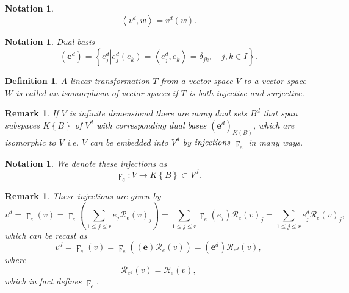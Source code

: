 \documentclass[aps,preprint]{revtex4}%
\newtheorem{definition}[theorem]{Definition}
\newtheorem{notation}[theorem]{Notation}
\newtheorem{remark}[theorem]{Remark}
\begin{document}
\begin{notation}%
\begin{equation}
\left\langle v^{d},w\right\rangle =v^{d}\left(  w\right)  .
\end{equation}

\end{notation}

\begin{notation}
Dual basis
\begin{equation}
\left(  \mathbf{e}^{d}\right)  =\left\{  \left.  e_{j}^{d}\right\vert
e_{j}^{d}\left(  e_{k}\right)  =\left\langle e_{j}^{d},e_{k}\right\rangle
=\delta_{jk},\quad j,k\in I\right\}  .
\end{equation}

\end{notation}

\begin{definition}
A linear transformation $T$ from a vector space $V$ to a vector space $W$ is
called an \emph{isomorphism of vector spaces} if $T$ is both \emph{injective}
and \emph{surjective}.
\end{definition}

\begin{remark}
If $V$ is infinite dimensional there are many dual sets $B^{d}$ that span
subspaces $K\left\{  B\right\}  $ of $V^{d}$ with corresponding dual bases
$\left(  \mathbf{e}^{d}\right)  _{K\left(  B\right)  }$, which are isomorphic
to $V$ i.e. $V$ can be embedded \emph{into} $V^{d}$ by $\emph{injections}$
$\digamma_{e}$ in many ways.
\end{remark}

\begin{notation}
We denote these injections as
\begin{equation}
\digamma_{e}:V\rightarrow K\left\{  B\right\}  \subset V^{d}.
\end{equation}

\end{notation}

\begin{remark}
These injections are given by
\begin{equation}
v^{d}=\digamma_{e}\left(  v\right)  =\digamma_{e}\left(  \sum_{1\leq j\leq
r}e_{j}\mathcal{R}_{e}\left(  v\right)  _{j}\right)  =\sum_{1\leq j\leq
r}\digamma_{e}\left(  e_{j}\right)  \mathcal{R}_{e}\left(  v\right)  _{j}%
=\sum_{1\leq j\leq r}e_{j}^{d}\mathcal{R}_{e}\left(  v\right)  _{j},
\end{equation}
which can be recast as
\begin{equation}
v^{d}=\digamma_{e}\left(  v\right)  =\digamma_{e}\left(  \overset{}{\left(
\mathbf{e}\right)  \mathcal{R}_{e}\left(  v\right)  }\right)  =\left(
\mathbf{e}^{d}\right)  \mathcal{R}_{e^{d}}\left(  v\right)  ,
\end{equation}
where
\begin{equation}
\mathcal{R}_{e^{d}}\left(  v\right)  =\mathcal{R}_{e}\left(  v\right)  ,
\end{equation}
which in fact defines $\digamma_{e}.$
\end{remark}
\end{document}
